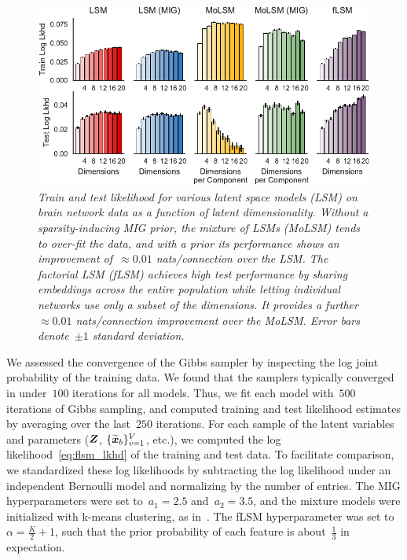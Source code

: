 \begin{figure}[t]
\includegraphics[width=\linewidth]{figures/lls.pdf}
\caption{\textit{Train and test likelihood for various
    latent space models (LSM) on brain network data as a function of
    latent dimensionality. Without a sparsity-inducing MIG prior,
    the mixture of LSMs (MoLSM) tends to over-fit the data, and with a prior its
    performance shows an improvement of~${\approx 0.01}$ nats/connection
    over the LSM.  The factorial LSM (fLSM)
    achieves high test performance by sharing embeddings across the
    entire population while letting individual networks use only a subset
    of the dimensions.  It provides a further~$\approx 0.01$ nats/connection
    improvement over the MoLSM. Error bars denote~$\pm 1$ standard deviation.}}
\label{fig:lls}
\end{figure}

We assessed the convergence of the Gibbs sampler by inspecting
the log joint probability of the training data.
We found that the samplers typically converged 
in under~$100$ iterations for all models. Thus, we fit each model
with~$500$ iterations of Gibbs sampling, and computed training and test
likelihood 
estimates by averaging over the last~$250$ iterations.
For each sample of the latent variables and parameters ($\boldsymbol{Z}$,
$\{\widetilde{\boldsymbol{x}}_b\}_{v=1}^V$, etc.), we computed the log
likelihood~\eqref{eq:flsm_lkhd} of the training and test data.
To facilitate comparison, we standardized these log likelihoods
by subtracting the log likelihood under an independent
Bernoulli model and normalizing by the number of entries. 
The MIG hyperparameters were set to~$a_1=2.5$ and~$a_2=3.5$, and the
mixture models were initialized with k-means clustering,
as in~\citet{durante2016nonparametric}. The fLSM
hyperparameter was set to~${\alpha = \tfrac{K}{2}+1}$, such that the
prior probability of each feature is about~$\tfrac{1}{3}$ in expectation.


